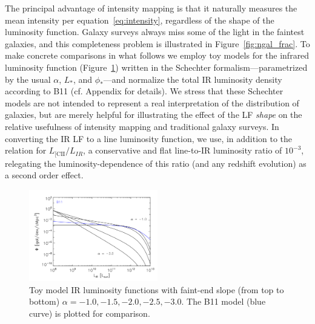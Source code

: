 \documentclass[iop]{emulateapj}
\begin{document}
The principal advantage of intensity mapping is that it naturally measures the mean intensity per equation~\ref{eq:intensity}, regardless of the shape of the luminosity function. Galaxy surveys always miss some of the light in the faintest galaxies, and this completeness problem is illustrated in Figure~\ref{fig:ngal_frac}. To make concrete comparisons in what follows we employ toy models for the infrared luminosity function (Figure~\ref{fig:schechterfuncs}) written in the Schechter formalism---parametrized by the usual $\alpha$, $L_*$, and $\phi_*$---and normalize the total IR luminosity density according to B11 (cf. Appendix for details). We stress that these Schechter models are not intended to represent a real interpretation of the distribution of galaxies, but are merely helpful for illustrating the effect of the LF \emph{shape} on the relative usefulness of intensity mapping and traditional galaxy surveys. In converting the IR LF to a line luminosity function, we use, in addition to the \citet{spinoglio12} relation for $L_{\textrm{[CII}}/L_{IR}$, a conservative and flat line-to-IR luminosity ratio of $10^{-3}$, relegating the luminosity-dependence of this ratio (and any redshift evolution) as a second order effect. 

\begin{figure}
\centering
\includegraphics[width=0.5\textwidth]{phi_lir_schechter_bethermin11_Lstar1d12_Lmin1d8_Lmax1d13}
\caption{Toy model IR luminosity functions with faint-end slope (from top to bottom) $\alpha=-1.0, -1.5, -2.0, -2.5, -3.0$. The B11 model (blue curve) is plotted for comparison.}
\label{fig:schechterfuncs}
\end{figure}
\end{document}

